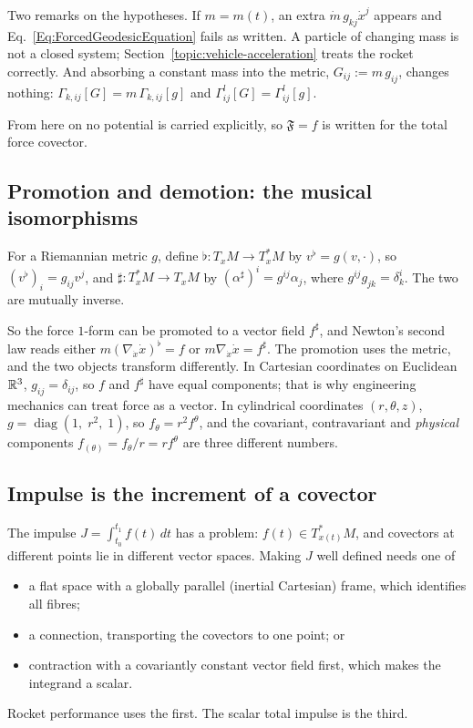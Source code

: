 Two remarks on the hypotheses. If $m=m(t)$, an extra
$\dot m\,g_{kj}\dot x^j$ appears and Eq.~\ref{Eq:ForcedGeodesicEquation}
fails as written. A particle of changing mass is not a closed system;
Section~\ref{topic:vehicle-acceleration} treats the rocket correctly. And
absorbing a constant mass into the metric, $G_{ij}:=m\,g_{ij}$, changes
nothing: $\Gamma_{k,ij}[G]=m\,\Gamma_{k,ij}[g]$ and
$\Gamma^l_{ij}[G]=\Gamma^l_{ij}[g]$.

From here on no potential is carried explicitly, so $\mathfrak F=f$ is
written for the total force covector.

\subsection{Promotion and demotion: the musical isomorphisms}
\begin{definition}
For a Riemannian metric $g$, define
$\flat:T_xM\to T^*_xM$ by $v^\flat=g(v,\cdot)$, so
$(v^\flat)_i=g_{ij}v^j$, and $\sharp:T^*_xM\to T_xM$ by
$(\alpha^\sharp)^i=g^{ij}\alpha_j$, where $g^{ij}g_{jk}=\delta^i_k$. The two
are mutually inverse.
\end{definition}

So the force $1$-form can be promoted to a vector field $f^\sharp$, and
Newton's second law reads either $m(\nabla_{\dot x}\dot x)^\flat=f$ or
$m\nabla_{\dot x}\dot x=f^\sharp$. The promotion uses the metric, and the two
objects transform differently. In Cartesian coordinates on Euclidean
$\mathbb{R}^3$, $g_{ij}=\delta_{ij}$, so $f$ and $f^\sharp$ have equal components;
that is why engineering mechanics can treat force as a vector. In
cylindrical coordinates $(r,\theta,z)$,
$g=\operatorname{diag}(1,\;r^2,\;1)$, so $f_\theta=r^2f^\theta$, and the
covariant, contravariant and \emph{physical} components
$f_{(\theta)}=f_\theta/r=r f^\theta$ are three different numbers.

\subsection{Impulse is the increment of a covector}
The impulse $J=\int_{t_0}^{t_1}f(t)\,dt$ has a problem: $f(t)\in
T^*_{x(t)}M$, and covectors at different points lie in different vector
spaces. Making $J$ well defined needs one of
\begin{itemize}\itemsep2pt
\item a flat space with a globally parallel (inertial Cartesian) frame,
      which identifies all fibres;
\item a connection, transporting the covectors to one point; or
\item contraction with a covariantly constant vector field first, which
      makes the integrand a scalar.
\end{itemize}
Rocket performance uses the first. The scalar total impulse is the third.

